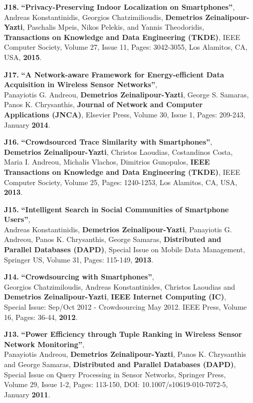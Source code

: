 \documentclass[10pt]{article}
\begin{document}
\begin{enumerate}
\item[{\bf J18.}]
\label{J18} %
{\bf ``Privacy-Preserving Indoor Localization on Smartphones''}, \\
Andreas Konstantinidis, Georgios Chatzimilioudis, {\bf Demetrios Zeinalipour-Yazti}, Paschalis Mpeis, Nikos Pelekis,  and Yannis Theodoridis,
{\bf Transactions on Knowledge and Data Engineering (TKDE)},
IEEE Computer Society, Volume 27, Issue 11, Pages: 3042-3055, Los Alamitos, CA, USA, {\bf 2015}.

\item[{\bf J17.}] 
\label{J17} %
{\bf ``A Network-aware Framework for Energy-efficient Data Acquisition in Wireless Sensor Networks''}, \\
Panayiotis G. Andreou, {\bf Demetrios Zeinalipour-Yazti}, George S. Samaras, Panos K. Chrysanthis,
{\bf Journal of Network and Computer Applications (JNCA)},  Elsevier Press,  
Volume 30, Issue 1, Pages: 209-243, January {\bf 2014}.  
 
\item[{\bf J16.}] 
\label{J16}
{\bf ``Crowdsourced Trace Similarity with Smartphones''}, \\
{\bf Demetrios Zeinalipour-Yazti}, Christos Laoudias, Costandinos Costa, Maria I. Andreou, Michalis Vlachos, Dimitrios Gunopulos, {\bf IEEE Transactions on Knowledge and Data Engineering (TKDE)},
IEEE Computer Society, Volume 25, Pages: 1240-1253, Los Alamitos, CA, USA, {\bf 2013}.  

\item[{\bf J15.}] 
\label{J15}
{\bf ``Intelligent Search in Social Communities of Smartphone Users''}, \\
Andreas Konstantinidis, {\bf Demetrios Zeinalipour-Yazti}, Panayiotis G. Andreou, 
Panos K. Chrysanthis, George Samaras, 
{\bf Distributed and Parallel Databases (DAPD)}, Special Issue on Mobile Data Management, 
Springer US, Volume 31, Pages: 115-149, {\bf 2013}.

\item[{\bf J14.}] 
\label{J14}
{\bf ``Crowdsourcing with Smartphones''}, \\
Georgios Chatzimiloudis, Andreas Konstantinides, Christos Laoudias and {\bf Demetrios Zeinalipour-Yazti}, 
{\bf IEEE Internet Computing (IC)}, Special Issue: Sep/Oct 2012 - Crowdsourcing May 2012. IEEE Press, Volume 16, Pages: 36-44, {\bf 2012}.

\item[{\bf J13.}] 
\label{J13}
{\bf ``Power Efficiency through Tuple Ranking in Wireless Sensor Network Monitoring''},\\
Panayiotis Andreou, {\bf Demetrios Zeinalipour-Yazti}, Panos K. Chrysanthis and George Samaras,
{\bf Distributed and Parallel Databases (DAPD)}, Special Issue on Query Processing in Sensor Networks, Springer Press, Volume 29, Issue 1-2, Pages: 113-150, DOI: 10.1007/s10619-010-7072-5, January {\bf 2011}.


\end{enumerate}
\end{document}
